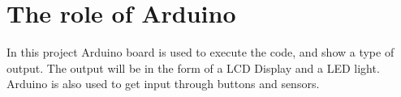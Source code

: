 \section{The role of Arduino}



In this project Arduino board is used to execute the code, and show a type of output. The output will be in the form of a LCD Display and a LED light. 
Arduino is also used to get input through buttons and sensors. 
